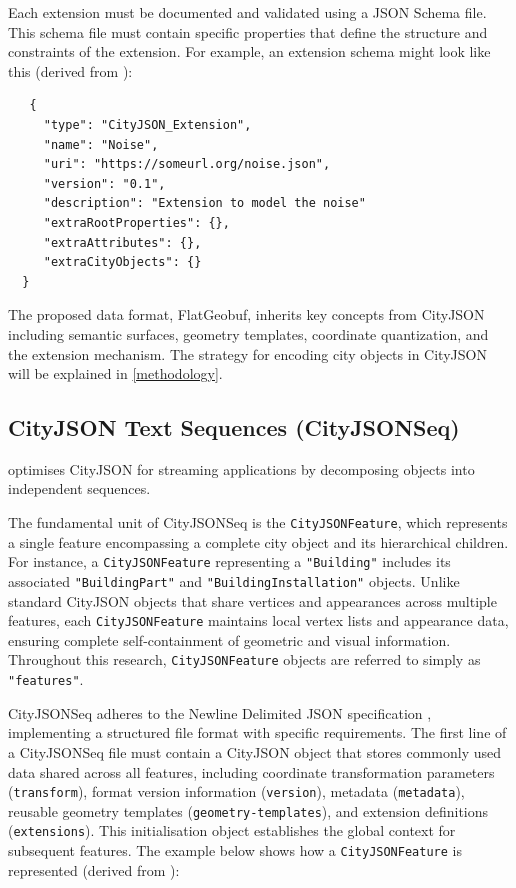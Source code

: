 Each extension must be documented and validated using a JSON Schema file. This schema file must contain specific properties that define the structure and constraints of the extension. For example, an extension schema might look like this (derived from \citet{ledoux_2019}):

\begin{lstlisting}
   {
     "type": "CityJSON_Extension",
     "name": "Noise",
     "uri": "https://someurl.org/noise.json",
     "version": "0.1",
     "description": "Extension to model the noise"
     "extraRootProperties": {},
     "extraAttributes": {},
     "extraCityObjects": {}
  }
\end{lstlisting}

The proposed data format, FlatGeobuf, inherits key concepts from CityJSON including semantic surfaces, geometry templates, coordinate quantization, and the extension mechanism. The strategy for encoding city objects in CityJSON will be explained in \autoref{methodology}.

\subsection{CityJSON Text Sequences (CityJSONSeq)}
\label{rw:cityjson_enhancements:cityjsonseq}

\citet{ledoux_2024} optimises CityJSON for streaming applications by decomposing objects into independent sequences.

The fundamental unit of CityJSONSeq is the \texttt{CityJSONFeature}, which represents a single feature encompassing a complete city object and its hierarchical children. For instance, a \texttt{CityJSONFeature} representing a \texttt{"Building"} includes its associated \texttt{"BuildingPart"} and \texttt{"BuildingInstallation"} objects. Unlike standard CityJSON objects that share vertices and appearances across multiple features, each \texttt{CityJSONFeature} maintains local vertex lists and appearance data, ensuring complete self-containment of geometric and visual information. Throughout this research, \texttt{CityJSONFeature} objects are referred to simply as \texttt{"features"}.

CityJSONSeq adheres to the Newline Delimited JSON specification \citep{jsonnd}, implementing a structured file format with specific requirements. The first line of a CityJSONSeq file must contain a CityJSON object that stores commonly used data shared across all features, including coordinate transformation parameters (\texttt{transform}), format version information (\texttt{version}), metadata (\texttt{metadata}), reusable geometry templates (\texttt{geometry-templates}), and extension definitions (\texttt{extensions}). This initialisation object establishes the global context for subsequent features.
The example below shows how a \texttt{CityJSONFeature} is represented (derived from \citet{ledoux_2024}):

